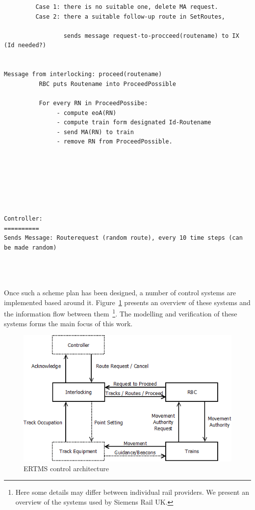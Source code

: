 \begin{verbatim}
         Case 1: there is no suitable one, delete MA request.
         Case 2: there a suitable follow-up route in SetRoutes,
               
                 sends message request-to-procceed(routename) to IX  (Id needed?)
 
       
Message from interlocking: proceed(routename)
          RBC puts Routename into ProceedPossible      

          For every RN in ProceedPossibe:
               - compute eoA(RN)
               - compute train form designated Id-Routename
               - send MA(RN) to train
               - remove RN from ProceedPossible.

               
     

            


Controller:
==========
Sends Message: Routerequest (random route), every 10 time steps (can be made random)




\end{verbatim}



Once such a scheme plan has been designed, a number of control systems
are implemented based around it. Figure~\ref{fig:arch} presents an
overview of these systems and the information flow between
them~\footnote{Here some details may differ between individual rail
providers. We present an overview of the systems used by Siemens Rail
UK.}. The modelling and verification of these systems forms the main
focus of this work.

\begin{figure}[h]
\includegraphics[width=\linewidth]{Images/architecture.png}
\caption{ERTMS control architecture}
\label{fig:arch}
\end{figure}

